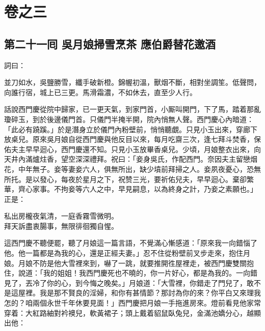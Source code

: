 \part*{{\titlename}卷之三}



\chapter*{第二十一囘 吳月娘掃雪烹茶 應伯爵替花邀酒}


詞曰：

\begin{myquote} 
並刀如水，吳鹽勝雪，纖手破新橙。錦幄初溫，獸烟不斷，相對坐調笙。低聲問，向誰行宿，城上已三更。馬滑霜濃，不如休去，直至少人行。

\end{myquote} 

話說西門慶從院中歸家，已一更天氣，到家門首，小厮叫開門，下了馬，踏着那亂瓊碎玉，到於後邊儀門首。只儀門半掩半開，院內悄無人聲。西門慶心內暗道：「此必有蹺蹊。」{}於是潛身立於儀門內粉壁前，悄悄聽覷。只見小玉出來，穿廊下放桌兒。原來吳月娘自從西門慶與他反目以來，{}每月吃齋三次，逢七拜斗焚香，保佑夫主早早迴心，西門慶還不知。只見小玉放畢香桌兒。少頃，月娘整衣出來，向天井內滿爐炷香，望空深深禮拜。祝曰：「妾身吳氏，作配西門。奈因夫主留戀烟花，中年無子。妾等妻妾六人，俱無所出，缺少墳前拜掃之人。妾夙夜憂心，恐無所托。是以發心，每夜於星月之下，祝赞三光，要祈佑兒夫，早早迴心。棄卻繁華，齊心家事。不拘妾等六人之中，早見嗣息，以為終身之計，乃妾之素願也。」{}正是：

\begin{myquote} 
私出房櫳夜氣清，一庭香霧雪微明。\\拜天訴盡衷腸事，無限徘徊獨自惺。
\end{myquote} 

這西門慶不聽便罷，聽了月娘這一篇言語，不覺滿心慚感道：「原來我一向錯惱了他。他一篇都是為我的心，還是正經夫妻。」忍不住從粉壁前叉步走來，抱住月娘。月娘不防是他大雪裡來到，嚇了一跳，就要推開徃屋裡走，被西門慶雙關抱住，說道：「我的姐姐！我西門慶死也不曉的，你一片好心，都是為我的。一向錯見了，丟冷了你的心，到今悔之晚矣。」月娘道：「大雪裡，你錯走了門兒了，敢不是這屋裡。我是那不賢良的淫婦，和你有甚情節？那討為你的來？你平白又來理我怎的？咱兩個永世千年休要見面！」西門慶把月娘一手拖進房來。燈前看見他家常穿着：大紅路紬對衿襖兒，軟黃裙子；頭上戴着貂鼠臥兔兒，金滿池嬌分心，越顯出他：


